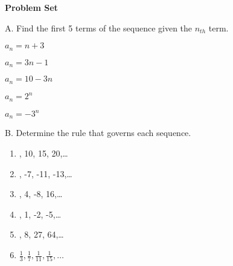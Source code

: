 \textbf{Problem Set}

\vspce

A. Find the first 5 terms of the sequence given the $n_{th}$ term.  
\begin{enumerate}
\begin{multicols}{2}

\item \hspce $a_{n} = n + 3$
\item \hspce $a_{n} = 3n - 1$
\item \hspce $a_{n} = 10 - 3n$
\item \hspce $a_{n} = 2^{n}$
\item \hspce $a_{n} = -3^{n}$

\end{multicols} 
\end{enumerate}

B. Determine the rule that governs each sequence.   
\begin{enumerate}
\item {}, 10, 15, 20,\ldots
\item {}, -7, -11, -13,\ldots 
\item {}, 4, -8, 16,\ldots
\item {}, 1, -2, -5,\ldots
\item {}, 8, 27, 64,\ldots 
\item \hspce $ {\displaystyle \frac{1}{3}, \frac{1}{7}, \frac{1}{11}, \frac{1}{15}, \ldots} $
\end{enumerate}